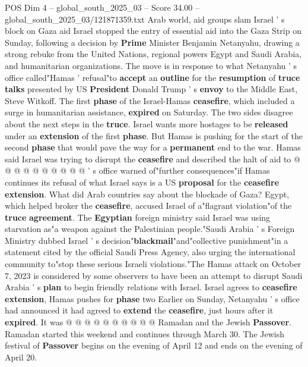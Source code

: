 \begin{textsample}{POS Dim 4 – global\_south\_2025\_03 – Score 34.00 – global\_south\_2025\_03/121871359.txt}  \label{ex:f4_pos_033}
Arab world, aid groups slam Israel ' s block on Gaza aid Israel stopped the entry of essential aid into the Gaza Strip on Sunday, following a decision by \textbf{Prime} Minister Benjamin Netanyahu, drawing a strong rebuke from the United Nations, regional powers Egypt and Saudi Arabia, and humanitarian organizations.
The move is in response to what Netanyahu ' s office called"Hamas ' refusal"to \textbf{accept} an \textbf{outline} for the \textbf{resumption} of \textbf{truce} \textbf{talks} presented by US \textbf{President} Donald Trump ' s \textbf{envoy} to the Middle East, Steve Witkoff.
The first \textbf{phase} of the Israel-Hamas \textbf{ceasefire}, which included a surge in humanitarian assistance, \textbf{expired} on Saturday.
The two sides disagree about the next steps in the \textbf{truce}.
Israel wants more hostages to be \textbf{released} under an \textbf{extension} of the first \textbf{phase}.
But Hamas is pushing for the start of the second \textbf{phase} that would pave the way for a \textbf{permanent} end to the war.
Hamas said Israel was trying to disrupt the \textbf{ceasefire} and described the halt of aid to @ @ @ @ @ @ @ @ @ @ ' s office warned of"further consequences"if Hamas continues its refusal of what Israel says is a US \textbf{proposal} for the \textbf{ceasefire} \textbf{extension}.
What did Arab countries say about the blockade of Gaza?
Egypt, which helped broker the \textbf{ceasefire}, accused Israel of a"flagrant violation"of the \textbf{truce} \textbf{agreement}.
The \textbf{Egyptian} foreign ministry said Israel was using starvation as"a weapon against the Palestinian people."Saudi Arabia ' s Foreign Ministry dubbed Israel ' s decision"\textbf{blackmail}"and"collective punishment"in a statement cited by the official Saudi Press Agency, also urging the international community to"stop these serious Israeli violations."The Hamas attack on October 7, 2023 is considered by some observers to have been an attempt to disrupt Saudi Arabia ' s \textbf{plan} to begin friendly relations with Israel.
Israel agrees to \textbf{ceasefire} \textbf{extension}, Hamas pushes for \textbf{phase} two Earlier on Sunday, Netanyahu ' s office had announced it had agreed to \textbf{extend} the \textbf{ceasefire}, just hours after it \textbf{expired}.
It was @ @ @ @ @ @ @ @ @ @ Ramadan and the Jewish \textbf{Passover}.
Ramadan started this weekend and continues through March 30.
The Jewish festival of \textbf{Passover} begins on the evening of April 12 and ends on the evening of April 20.

\end{textsample}
